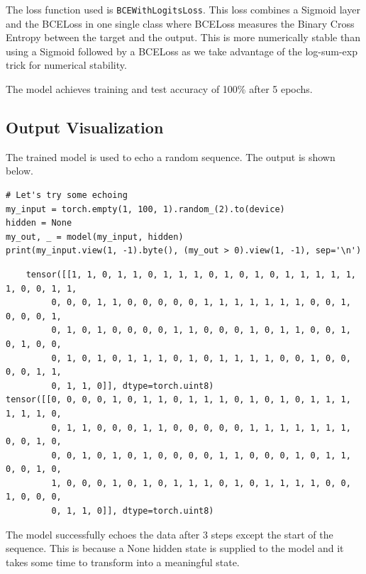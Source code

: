 The loss function used is \texttt{BCEWithLogitsLoss}. 
This loss combines a Sigmoid layer and the BCELoss in one single class where BCELoss measures the Binary Cross Entropy between the target and the output. 
This is more numerically stable than using a Sigmoid followed by a BCELoss as we take advantage of the log-sum-exp trick for numerical stability.

The model achieves training and test accuracy of 100\% after 5 epochs.

\subsection{Output Visualization}
The trained model is used to echo a random sequence. 
The output is shown below.
\begin{verbatim}
# Let's try some echoing
my_input = torch.empty(1, 100, 1).random_(2).to(device)
hidden = None
my_out, _ = model(my_input, hidden)
print(my_input.view(1, -1).byte(), (my_out > 0).view(1, -1), sep='\n')
\end{verbatim}
\begin{verbatim}
    tensor([[1, 1, 0, 1, 1, 0, 1, 1, 1, 0, 1, 0, 1, 0, 1, 1, 1, 1, 1, 1, 0, 0, 1, 1,
         0, 0, 0, 1, 1, 0, 0, 0, 0, 0, 1, 1, 1, 1, 1, 1, 1, 0, 0, 1, 0, 0, 0, 1,
         0, 1, 0, 1, 0, 0, 0, 0, 1, 1, 0, 0, 0, 1, 0, 1, 1, 0, 0, 1, 0, 1, 0, 0,
         0, 1, 0, 1, 0, 1, 1, 1, 0, 1, 0, 1, 1, 1, 1, 0, 0, 1, 0, 0, 0, 0, 1, 1,
         0, 1, 1, 0]], dtype=torch.uint8)
tensor([[0, 0, 0, 0, 1, 0, 1, 1, 0, 1, 1, 1, 0, 1, 0, 1, 0, 1, 1, 1, 1, 1, 1, 0,
         0, 1, 1, 0, 0, 0, 1, 1, 0, 0, 0, 0, 0, 1, 1, 1, 1, 1, 1, 1, 0, 0, 1, 0,
         0, 0, 1, 0, 1, 0, 1, 0, 0, 0, 0, 1, 1, 0, 0, 0, 1, 0, 1, 1, 0, 0, 1, 0,
         1, 0, 0, 0, 1, 0, 1, 0, 1, 1, 1, 0, 1, 0, 1, 1, 1, 1, 0, 0, 1, 0, 0, 0,
         0, 1, 1, 0]], dtype=torch.uint8)
\end{verbatim}
The model successfully echoes the data after 3 steps except the start of the sequence. 
This is because a None hidden state is supplied to the model and it takes some time to transform into a meaningful state.


